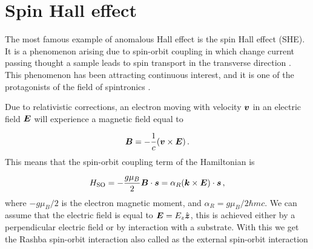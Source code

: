 \section{Spin Hall effect}
The most famous example of anomalous Hall effect is the spin Hall effect (SHE). It is a phenomenon arising due to spin-orbit coupling in which change current passing thought a sample leads to spin transport in the transverse direction \cite{d1971spin}. This phenomenon has been attracting continuous interest, and it is one of the protagonists of the field of spintronics \cite{wolf2001spintronics}.


Due to relativistic corrections, an electron moving with velocity $\boldsymbol{v}$ in an electric field $\boldsymbol{E}$ will experience a magnetic field equal to \cite{jackson1999classical}

\begin{equation}
    \boldsymbol{B}=-\frac 1c(\boldsymbol{v} \times \boldsymbol{E})\,.
\end{equation}
This means that the spin-orbit coupling term of the Hamiltonian is 

\begin{equation}
    H_\textrm{SO}=-\frac{g\mu_B}{2}\boldsymbol{B}\cdot\boldsymbol{s}=
    \alpha_R(\boldsymbol{k} \times \boldsymbol{E})\cdot \boldsymbol{s}
    \label{eq:so-int}\,,
\end{equation}
where $-g\mu_B/2$ is the electron magnetic moment, and $\alpha_R=g\mu_B/2\hbar mc$. We can assume that the electric field is equal to $\boldsymbol{E}= E_z \hat{\boldsymbol{z}}$, this is achieved  either by a perpendicular electric field or by interaction with a substrate. With this we get the Rashba spin-orbit interaction also called as the external spin-orbit interaction\cite{bychkov1984properties}

